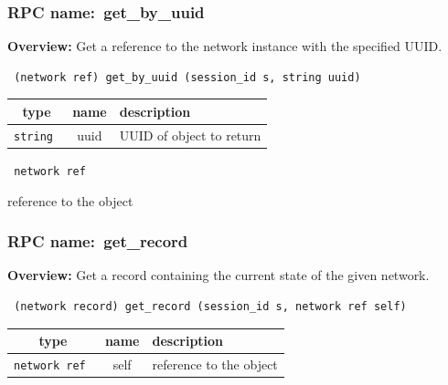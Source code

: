 \vspace{0.3cm}
\vspace{0.3cm}
\vspace{0.3cm}
\subsubsection{RPC name:~get\_by\_uuid}

{\bf Overview:} 
Get a reference to the network instance with the specified UUID.

\begin{verbatim} (network ref) get_by_uuid (session_id s, string uuid)\end{verbatim}



 
\vspace{0.3cm}
\begin{tabular}{|c|c|p{7cm}|}
 \hline
{\bf type} & {\bf name} & {\bf description} \\ \hline
{\tt string } & uuid & UUID of object to return \\ \hline 

\end{tabular}

\vspace{0.3cm}

{\tt 
network ref
}


reference to the object
\vspace{0.3cm}
\vspace{0.3cm}
\vspace{0.3cm}
\subsubsection{RPC name:~get\_record}

{\bf Overview:} 
Get a record containing the current state of the given network.

\begin{verbatim} (network record) get_record (session_id s, network ref self)\end{verbatim}



 
\vspace{0.3cm}
\begin{tabular}{|c|c|p{7cm}|}
 \hline
{\bf type} & {\bf name} & {\bf description} \\ \hline
{\tt network ref } & self & reference to the object \\ \hline 

\end{tabular}

